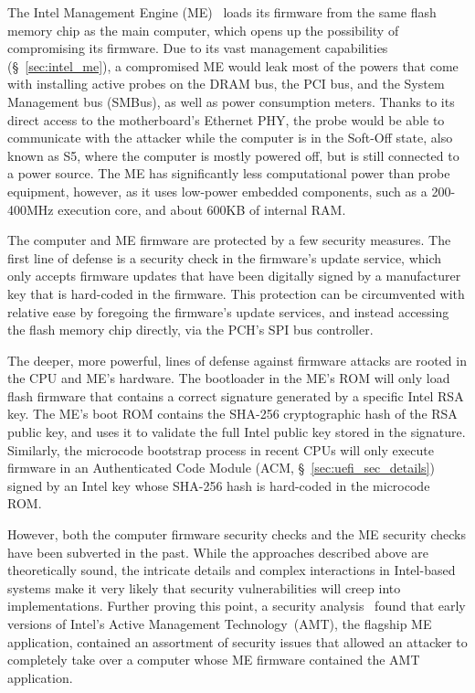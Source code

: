 The Intel Management Engine (ME)~\cite{ruan2014intelme} loads its firmware
from the same flash memory chip as the main computer, which opens up the
possibility of compromising its firmware. Due to its vast management
capabilities (\S~\ref{sec:intel_me}), a compromised ME would leak most of the
powers that come with installing active probes on the DRAM bus, the PCI bus,
and the System Management bus (SMBus), as well as power consumption meters.
Thanks to its direct access to the motherboard's Ethernet PHY, the probe would
be able to communicate with the attacker while the computer is in the Soft-Off
state, also known as S5, where the computer is mostly powered off, but is still
connected to a power source.  The ME has significantly less computational power
than probe equipment, however, as it uses low-power embedded components, such
as a 200-400MHz execution core, and about 600KB of internal RAM.

The computer and ME firmware are protected by a few security measures. The
first line of defense is a security check in the firmware's update service,
which only accepts firmware updates that have been digitally signed by a
manufacturer key that is hard-coded in the firmware. This protection can be
circumvented with relative ease by foregoing the firmware's update services,
and instead accessing the flash memory chip directly, via the PCH's SPI bus
controller.

The deeper, more powerful, lines of defense against firmware attacks are rooted
in the CPU and ME's hardware. The bootloader in the ME's ROM will only load
flash firmware that contains a correct signature generated by a specific Intel
RSA key. The ME's boot ROM contains the SHA-256 cryptographic hash of the RSA
public key, and uses it to validate the full Intel public key stored in the
signature. Similarly, the microcode bootstrap process in recent CPUs will only
execute firmware in an Authenticated Code Module
(ACM, \S~\ref{sec:uefi_sec_details}) signed by an Intel key whose SHA-256 hash
is hard-coded in the microcode ROM.

However, both the computer firmware security checks \cite{wojtczuk2010bios,
furtak2014bios} and the ME security checks \cite{tereshkin2009amt} have been
subverted in the past. While the approaches described above are theoretically
sound, the intricate details and complex interactions in Intel-based systems
make it very likely that security vulnerabilities will creep into
implementations. Further proving this point, a security
analysis~\cite{ververis2010security} found that early versions of Intel's
Active Management Technology~(AMT), the flagship ME application, contained an
assortment of security issues that allowed an attacker to completely take over
a computer whose ME firmware contained the AMT application.


